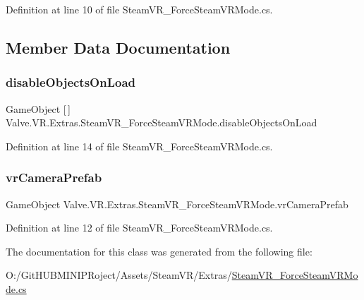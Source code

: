 Definition at line 10 of file Steam\+V\+R\+\_\+\+Force\+Steam\+V\+R\+Mode.\+cs.



\subsection{Member Data Documentation}
\mbox{\label{class_valve_1_1_v_r_1_1_extras_1_1_steam_v_r___force_steam_v_r_mode_a9d1e51db77729473daef26fae736a1f3}} 
\subsubsection{\texorpdfstring{disableObjectsOnLoad}{disableObjectsOnLoad}}
{\footnotesize\ttfamily Game\+Object \mbox{[}$\,$\mbox{]} Valve.\+V\+R.\+Extras.\+Steam\+V\+R\+\_\+\+Force\+Steam\+V\+R\+Mode.\+disable\+Objects\+On\+Load}



Definition at line 14 of file Steam\+V\+R\+\_\+\+Force\+Steam\+V\+R\+Mode.\+cs.

\mbox{\label{class_valve_1_1_v_r_1_1_extras_1_1_steam_v_r___force_steam_v_r_mode_ab648212448fc26dcb456e692f01b89c8}} 
\subsubsection{\texorpdfstring{vrCameraPrefab}{vrCameraPrefab}}
{\footnotesize\ttfamily Game\+Object Valve.\+V\+R.\+Extras.\+Steam\+V\+R\+\_\+\+Force\+Steam\+V\+R\+Mode.\+vr\+Camera\+Prefab}



Definition at line 12 of file Steam\+V\+R\+\_\+\+Force\+Steam\+V\+R\+Mode.\+cs.



The documentation for this class was generated from the following file\+:\begin{DoxyCompactItemize}
\item 
O\+:/\+Git\+H\+U\+B\+M\+I\+N\+I\+P\+Roject/\+Assets/\+Steam\+V\+R/\+Extras/\mbox{\hyperlink{_steam_v_r___force_steam_v_r_mode_8cs}{Steam\+V\+R\+\_\+\+Force\+Steam\+V\+R\+Mode.\+cs}}\end{DoxyCompactItemize}
